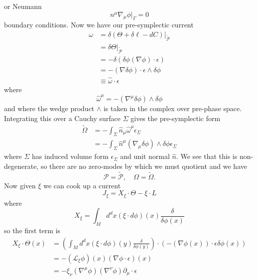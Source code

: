 \documentclass[11pt,letterpaper]{article}
\newcommand{\LP}{\left(}
\newcommand{\RP}{\right)}
\newcommand{\mc}[1]{\mathcal{#1}}
\newcommand{\D}{\partial}
\begin{document}
or Neumann \begin{equation}
n^\mu \nabla_\mu \phi|_\Gamma = 0
\end{equation}
boundary conditions. Now we have our pre-symplectic current \begin{equation}
\begin{aligned}
\omega & = \delta \LP \Theta + \delta \ell - d C \RP|_{\tilde{\mc{P}}} \\
& = \delta \Theta |_{\tilde{\mc{P}}} \\
& = - \delta \LP \delta \phi (\nabla \phi) \cdot \epsilon \RP \\
& = - (\nabla \delta \phi) \cdot \epsilon \wedge \delta \phi \\
& \equiv \hat{\omega} \cdot \epsilon
\end{aligned}
\end{equation}
where \begin{equation}
\hat{\omega}^\mu = - (\nabla^\mu \delta \phi) \wedge \delta \phi 
\end{equation}
and where the wedge product $\wedge$ is taken in the complex over pre-phase space. Integrating this over a Cauchy surface $\Sigma$ gives the pre-symplectic form \begin{equation}
\begin{aligned}
\tilde{\Omega} & = - \int_\Sigma \hat{n}_\mu \hat{\omega}^\mu \epsilon_\Sigma \\
& = - \int_\Sigma \hat{n}^\mu (\nabla_\mu \delta \phi) \wedge \delta \phi \epsilon_\Sigma
\end{aligned}
\end{equation}
where $\Sigma$ has induced volume form $\epsilon_\Sigma$ and unit normal $\hat{n}$. We see that this is non-degenerate, so there are no zero-modes by which we must quotient and we have \begin{equation}
\mc{P} = \tilde{\mc{P}}, \quad \Omega = \tilde{\Omega}.
\end{equation}
Now given $\xi$ we can cook up a current \begin{equation}
J_\xi = X_\xi \cdot \Theta - \xi \cdot L
\end{equation}
where \begin{equation}
X_\xi = \int_M d^d x  (\xi \cdot d \phi)(x) \frac{\delta}{\delta \phi(x)}
\end{equation}
so the first term is \begin{equation}
\begin{aligned}
X_\xi \cdot \Theta (x) & = \LP \int_M d^d x (\xi \cdot d \phi)(y) \frac{\delta}{\delta \phi(y)} \RP \cdot \LP - (\nabla \phi(x)) \cdot \epsilon \delta \phi(x) \RP \\
& = - (\mc{L}_\xi \phi)(x) (\nabla \phi \cdot \epsilon)(x) \\
& = - \xi_\nu (\nabla^\mu \phi) (\nabla^\nu \phi) \D_\mu \cdot \epsilon
\end{aligned}
\end{equation}
\end{document}
